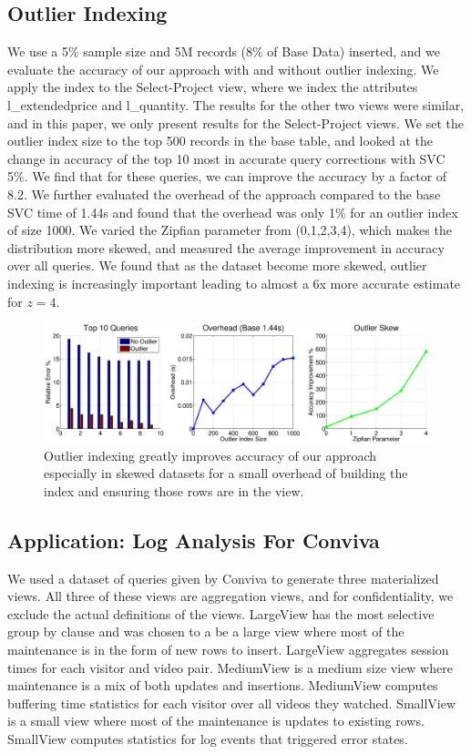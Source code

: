 \subsection{Outlier Indexing}
We use a 5\% sample size and 5M records (8\% of Base Data) inserted, and we evaluate the accuracy of our approach with and without outlier indexing.
We apply the index to the Select-Project view, where we index the attributes l\_extendedprice and l\_quantity.
The results for the other two views were similar, and in this paper, we only present results for the Select-Project views.
We set the outlier index size to the top 500 records in the base table, and looked at the change in accuracy of the top 10 most in accurate query corrections with SVC 5\%.
We find that for these queries, we can improve the accuracy by a factor of 8.2.
We further evaluated the overhead of the approach compared to the base SVC time of 1.44s and found that the overhead was only 1\% for an outlier index of size 1000.
We varied the Zipfian parameter from (0,1,2,3,4), which makes the distribution more skewed, and measured the average improvement in accuracy over all queries.
We found that as the dataset become more skewed, outlier indexing is increasingly important leading to almost a 6x more accurate estimate for $z=4$.

\begin{figure}[ht!]
\hspace{-4em}
\includegraphics[scale=0.22]{exp/exp6-outlier-full.eps}
 \caption{Outlier indexing greatly improves accuracy of our approach especially in skewed datasets for a small overhead of building the index and ensuring those rows are in the view.\label{exp7outlier}}
\end{figure}

\subsection{Application: Log Analysis For Conviva}
We used a dataset of queries given by Conviva to generate three materialized views.
All three of these views are aggregation views, and for confidentiality, we exclude the actual definitions of the views.
LargeView has the most selective group by clause and was chosen to a be a large view where most of the maintenance is in the form of new rows to insert.
LargeView aggregates session times for each visitor and video pair.
MediumView is a medium size view where maintenance is a mix of both updates and insertions.
MediumView computes buffering time statistics for each visitor over all videos they watched.
SmallView is a small view where most of the maintenance is updates to existing rows.
SmallView computes statistics for log events that triggered error states.

